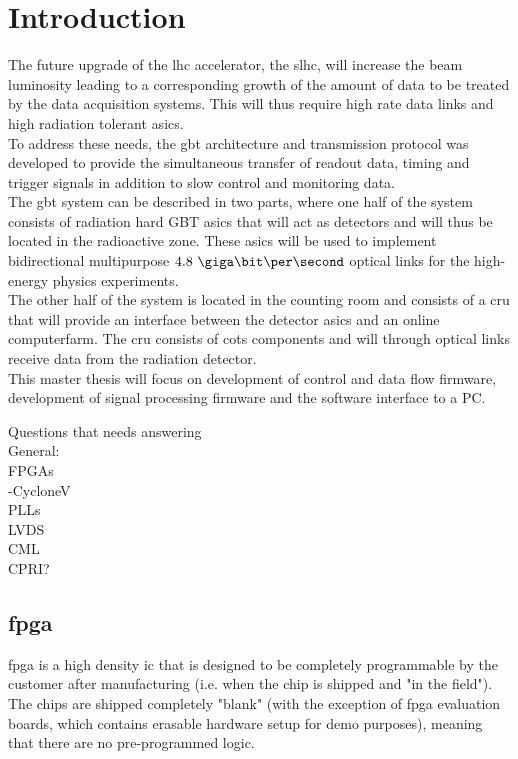 \documentclass[main.tex]{subfiles}
\begin{document}
\chapter{Introduction}

The future upgrade of the \gls{lhc} accelerator, the \gls{slhc}, will increase the beam luminosity leading to a corresponding growth of the amount of data to be treated by the data acquisition systems. This will thus require high rate data links and high radiation tolerant \glspl{asic}.\\

To address these needs, the \gls{gbt} architecture and transmission protocol was developed to provide the simultaneous transfer of readout data, timing and trigger signals in addition to slow control and monitoring data. \\

The \gls{gbt} system can be described in two parts, where one half of the system consists of radiation hard GBT \glspl{asic} that will act as detectors and will thus be located in the radioactive zone. These \glspl{asic} will be used to implement bidirectional multipurpose $4.8~\giga\bit\per\second$ optical links for the high-energy physics experiments. \\

The other half of the system is located in the counting room and consists of a \gls{cru} that will provide an interface between the detector \glspl{asic} and an online computerfarm. The \gls{cru} consists of \gls{cots} components and will through optical links receive data from the radiation detector. \\
This master thesis will focus on development of control and data flow firmware, development of signal processing firmware and the software interface to a PC.


Questions that needs answering\\
General:\\
FPGAs\\
-CycloneV\\
PLLs\\
LVDS\\
CML\\
CPRI?\\

\section{\acrfull{fpga}}

\Gls{fpga} is a high density \gls{ic} that is designed to be completely programmable by the customer after manufacturing (i.e. when the chip is shipped and "in the field"). The chips are shipped completely "blank" (with the exception of \gls{fpga} evaluation boards, which contains erasable hardware setup for demo purposes), meaning that there are no pre-programmed logic. 
\end{document}
